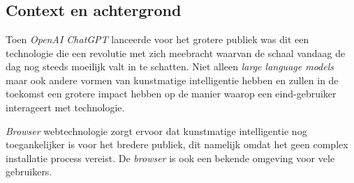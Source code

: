 
\chapter{}
\label{ch:inleiding}



\section{Context en achtergrond} %
Toen \textit{OpenAI ChatGPT} lanceerde voor het grotere publiek was dit een technologie die een revolutie met zich meebracht waarvan de schaal vandaag de dag nog steeds moeilijk valt in te schatten. Niet alleen \textit{large language models} maar ook andere vormen van kunstmatige intelligentie hebben en zullen in de toekomst een grotere impact hebben op de manier waarop een eind-gebruiker interageert met technologie. \autocite{Marr2023}

\bigbreak{}

\textit{Browser} webtechnologie zorgt ervoor dat kunstmatige intelligentie nog toegankelijker is voor het bredere publiek, dit namelijk omdat het geen complex installatie process vereist. De \textit{browser} is ook een bekende omgeving voor vele gebruikers.


